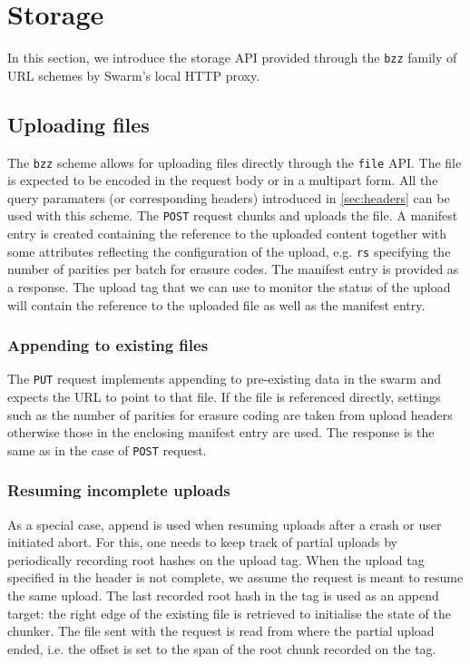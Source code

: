 \section{Storage \statusgreen}\label{sec:storage-ux}

\green{}


In this section, we introduce the storage API provided through the \lstinline{bzz} family of URL schemes by Swarm's local HTTP proxy.

\subsection{Uploading files \statusgreen}\label{sec:file-api}

The \lstinline{bzz} scheme allows for uploading files directly through the \lstinline{file} API. The file is expected to be encoded in the request body or in a multipart form. All the query paramaters (or corresponding headers)  introduced in \ref{sec:headers} can be used with this scheme. The \lstinline{POST} request chunks and uploads the file. A manifest entry is created containing the reference to the uploaded content together with some attributes reflecting the configuration of the upload, e.g. \lstinline{rs} specifying the number of parities per batch for erasure codes.
The manifest entry is provided as a response. The upload tag that we can use to monitor the status of the upload will contain the reference to the uploaded file as well as the manifest entry.

\subsubsection{Appending to existing files}\label{sec:append}

The \lstinline{PUT} request implements appending to pre-existing data in the swarm and expects the URL to point to that file. If the file is referenced directly, settings such as the number of parities for erasure coding are taken from upload headers otherwise those in the enclosing manifest entry are used. The response is the same as in the case of \lstinline{POST} request.


\subsubsection{Resuming incomplete uploads}\label{sec:resume}

As a special case, append is used when resuming uploads after a crash or user initiated abort. For this, one needs to keep track of partial uploads by periodically recording root hashes on the upload tag. When the upload tag specified in the header is not complete, we assume the request is meant to resume the same upload. The last recorded root hash in the tag is used as an append target: the right edge of the existing file is retrieved to initialise the state of the chunker. The file sent with the request is read from where the partial upload ended, i.e. the offset is set to the span of the root chunk recorded on the tag.

